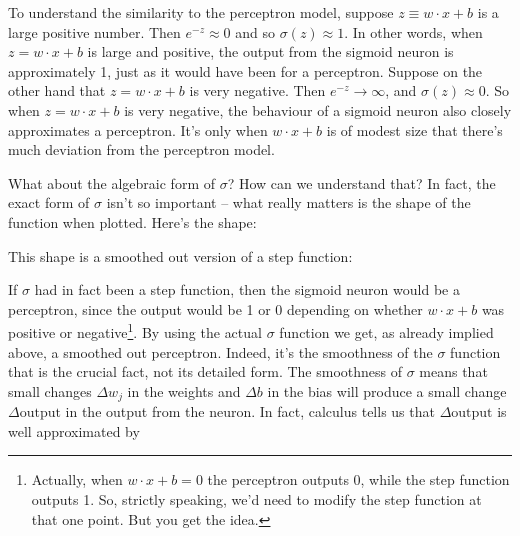 \documentclass[a4paper,twoside,10pt]{book}
\begin{document}
To understand the similarity to the perceptron model, suppose $z\equiv w\cdot x+b$ is a large positive number. Then $e^{-z}\approx0$ and so $\sigma(z)\approx 1$. In other words, when $z=w\cdot x+b$ is large and positive, the output from the sigmoid neuron is approximately 1, just as it would have been for a perceptron. Suppose on the other hand that $z=w\cdot x+b$ is very negative. Then $e^{-z}\to\infty$, and $\sigma(z)\approx0$. So when $z=w\cdot x+b$ is very negative, the behaviour of a sigmoid neuron also closely approximates a perceptron. It's only when $w\cdot x+b$ is of modest size that there's much deviation from the perceptron model.

What about the algebraic form of $\sigma$? How can we understand that? In fact, the exact form of $\sigma$ isn't so important -- what really matters is the shape of the function when plotted. Here's the shape:
\begin{center}
\end{center}
This shape is a smoothed out version of a step function:
\begin{center} 
\end{center}
If $\sigma$ had in fact been a step function, then the sigmoid neuron would be a perceptron, since the output would be 1 or 0 depending on whether $w\cdot x + b$ was positive or negative\footnote{Actually, when $w\cdot x+b = 0$ the perceptron outputs 0, while the step function outputs 1. So, strictly speaking, we'd need to modify the step function at that one point. But you get the idea.}. By using the actual $\sigma$ function we get, as already implied above, a smoothed out perceptron. Indeed, it's the smoothness of the $\sigma$ function that is the crucial fact, not its detailed form. The smoothness of $\sigma$ means that small changes $\Delta{}w_j$ in the weights and $\Delta{}b$ in the bias will produce a small change $\Delta\textrm{output}$ in the output from the neuron. In fact, calculus tells us that $\Delta\textrm{output}$ is well approximated by
\end{document}
